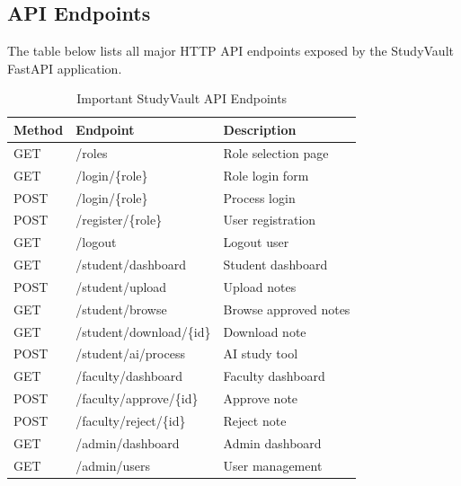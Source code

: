 \documentclass{sgcproject}
\begin{document}
\begin{appendices}
\chapter{API Endpoints}

The table below lists all major HTTP API endpoints exposed by the StudyVault FastAPI application.

\begin{table}[H]
\centering
\small
\begin{tabular}{|p{2cm}|p{5cm}|p{6cm}|}
\hline
\textbf{Method} & \textbf{Endpoint} & \textbf{Description} \\
\hline
GET & /roles & Role selection page \\
\hline
GET & /login/\{role\} & Role login form \\
\hline
POST & /login/\{role\} & Process login \\
\hline
POST & /register/\{role\} & User registration \\
\hline
GET & /logout & Logout user \\
\hline
GET & /student/dashboard & Student dashboard \\
\hline
POST & /student/upload & Upload notes \\
\hline
GET & /student/browse & Browse approved notes \\
\hline
GET & /student/download/\{id\} & Download note \\
\hline
POST & /student/ai/process & AI study tool \\
\hline
GET & /faculty/dashboard & Faculty dashboard \\
\hline
POST & /faculty/approve/\{id\} & Approve note \\
\hline
POST & /faculty/reject/\{id\} & Reject note \\
\hline
GET & /admin/dashboard & Admin dashboard \\
\hline
GET & /admin/users & User management \\
\hline
\end{tabular}
\caption{Important StudyVault API Endpoints}
\end{table}

\end{appendices}
\end{document}
